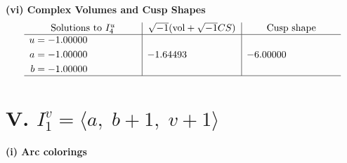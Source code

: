 \documentclass[1p]{elsarticle_modified}
\theoremstyle{definition}
\newcommand{\I}{\sqrt{-1}}
\begin{document}
\newpage\flushleft \textbf{(vi) Complex Volumes and Cusp Shapes}
$$\begin{array}{c|c|c}  
\text{Solutions to }I^u_{4}& \I (\text{vol} + \sqrt{-1}CS) & \text{Cusp shape}\\
 \hline 
\begin{aligned}
u &= -1.00000\phantom{ +0.000000I} \\
a &= -1.00000\phantom{ +0.000000I} \\
b &= -1.00000\phantom{ +0.000000I}\end{aligned}
 & -1.64493\phantom{ +0.000000I} & -6.00000\phantom{ +0.000000I}\\
 \hline 
 \end{array}$$\newpage\newpage\renewcommand{\arraystretch}{1}
\centering \section*{V. $I^v_{1}= \langle a,\;b+1,\;v+1 \rangle$}
\flushleft \textbf{(i) Arc colorings}\\
\end{document}
